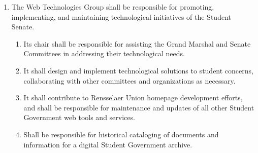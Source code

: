\documentclass{bylaws}
\begin{document}
\begin{enumerate}
\item The Web Technologies Group shall be responsible for promoting, implementing, and maintaining technological initiatives of
the Student Senate.
\begin{enumerate}
\item Its chair shall be responsible for assisting the Grand Marshal and Senate Committees in addressing their technological
needs.
\item It shall design and implement technological solutions to student concerns, collaborating with other committees and
organizations as necessary.
\item It shall contribute to Rensselaer Union homepage development efforts, and shall be responsible for maintenance and
updates of all other Student Government web tools and services.
\item Shall be responsible for historical cataloging of documents and information for a digital Student Government archive.
\end{enumerate}
\end{enumerate}
\end{document}
